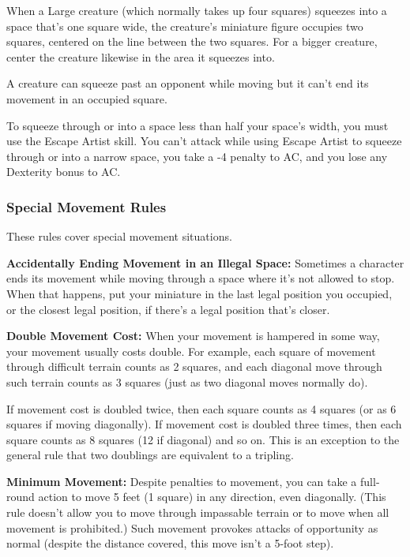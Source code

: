 \documentclass{article}
\begin{document}
When a Large creature (which normally takes up four squares) squeezes into a space 
that's one square wide, the creature's miniature figure occupies two squares, centered 
on the line between the two squares. For a bigger creature, center the creature 
likewise in the area it squeezes into.

A creature can squeeze past an opponent while moving but it can't end its movement 
in an occupied square.

To squeeze through or into a space less than half your space's width, you must 
use the Escape Artist skill. You can't attack while using Escape Artist to squeeze 
through or into a narrow space, you take a -4 penalty to AC, and you lose any Dexterity 
bonus to AC.

\vspace{12pt}
\subsubsection*{\textbf{Special Movement Rules}}

These rules cover special movement situations.

\textbf{Accidentally Ending Movement in an Illegal Space:} Sometimes a character 
ends its movement while moving through a space where it's not allowed to stop. 
When that happens, put your miniature in the last legal position you occupied, 
or the closest legal position, if there's a legal position that's closer.

\textbf{Double Movement Cost:} When your movement is hampered in some way, your 
movement usually costs double. For example, each square of movement through difficult 
terrain counts as 2 squares, and each diagonal move through such terrain counts 
as 3 squares (just as two diagonal moves normally do).

If movement cost is doubled twice, then each square counts as 4 squares (or as 
6 squares if moving diagonally). If movement cost is doubled three times, then 
each square counts as 8 squares (12 if diagonal) and so on. This is an exception 
to the general rule that two doublings are equivalent to a tripling.

\textbf{Minimum Movement:} Despite penalties to movement, you can take a full-round 
action to move 5 feet (1 square) in any direction, even diagonally. (This rule 
doesn't allow you to move through impassable terrain or to move when all movement 
is prohibited.) Such movement provokes attacks of opportunity as normal (despite 
the distance covered, this move isn't a 5-foot step).
\end{document}
